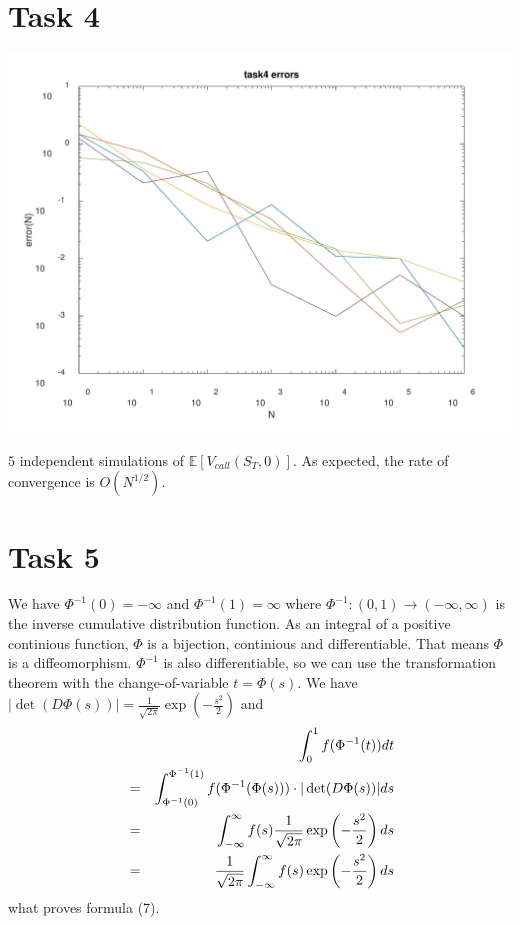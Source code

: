 \documentclass[10pt,a4paper]{article}
\begin{document}
\section*{Task 4}

\begin{center}
\includegraphics[scale=0.3]{task4.jpg}		
\end{center}	

$5$ independent simulations of $\mathbb{E}[V_{call}(S_T,0)]$. As expected, the rate of convergence is $O(N^{1/2})$.

\section*{Task 5}
We have $\Phi^{-1}(0)=-\infty$ and $\Phi^{-1}(1)=\infty$ where $\Phi^{-1}:(0,1)\to(-\infty,\infty)$ is the inverse cumulative distribution function. As an integral of a positive continious function, $\Phi$ is a bijection, continious and differentiable. That means $\Phi$ is a diffeomorphism. $\Phi^{-1}$ is also differentiable, so we can use the transformation theorem with the change-of-variable $t=\Phi(s)$. We have $|\det(D\Phi(s))|=\frac{1}{\sqrt{2\pi}}\exp(-\frac{s^2}{2})$ and
\begin{eqnarray}
&&\int_0^1 f(\Phi^{-1}(t))dt \notag\\
&=&\int_{\Phi^{-1}(0)}^{\Phi^{-1}(1)}f(\Phi^{-1}(\Phi(s)))\cdot|\det(D\Phi(s))|ds \notag\\
&=&\int_{-\infty}^{\infty}f(s)\frac{1}{\sqrt{2\pi}}\exp\left(-\frac{s^2}{2}\right)ds \notag\\
&=&\frac{1}{\sqrt{2\pi}}\int_{-\infty}^{\infty}f(s)\exp\left(-\frac{s^2}{2}\right)ds \notag
\end{eqnarray}
what proves formula (7).
\end{document}
